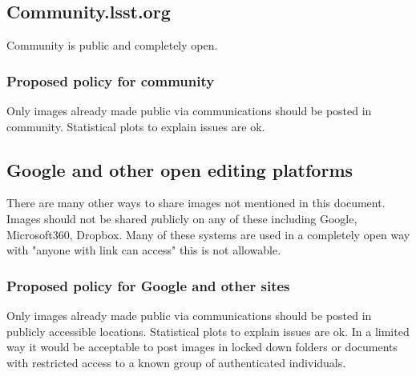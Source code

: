\subsection{ Community.lsst.org}
Community is public and completely open.
\subsubsection{Proposed policy for community}
Only images already made public via communications should be posted in community.
Statistical plots to explain issues are ok.

\subsection{ Google and other open editing platforms}
There are many other ways to share images not mentioned in this document.
Images should not be shared {\emph publicly} on any of these including Google, Microsoft360, Dropbox.
Many of these systems are used in a completely open way with "anyone with link can access" this is not allowable.

\subsubsection{Proposed policy for Google and other sites}
Only images already made public via communications should be posted in publicly accessible locations.
Statistical plots to explain issues are ok.
In a limited way it would be acceptable to post images in locked down folders or documents with restricted access to a known group of authenticated individuals.

